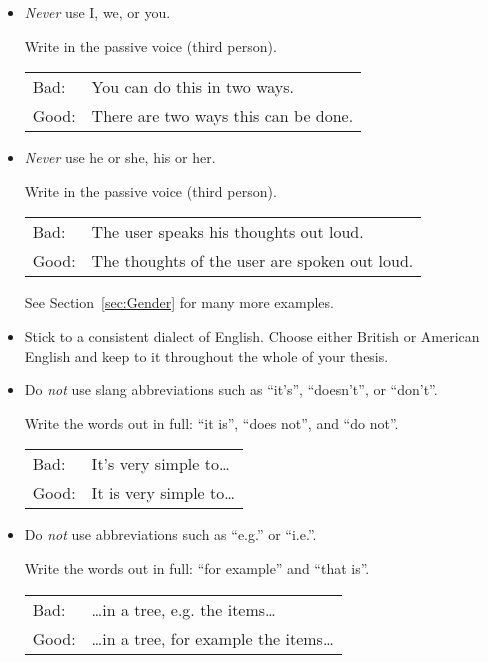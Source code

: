 \begin{itemize}

\item \emph{Never} use I, we, or you.

Write in the passive voice (third person).

\begin{tabular}{lp{0.9\hsize}}
Bad:  & You can do this in two ways.   \\
Good: & There are two ways this can be done.  \\
\end{tabular}



\item \emph{Never} use he or she, his or her.

Write in the passive voice (third person).

\begin{tabular}{lp{0.9\hsize}}
Bad:  & The user speaks his thoughts out loud.   \\
Good: & The thoughts of the user are spoken out loud.  \\
\end{tabular}

See Section~\ref{sec:Gender} for many more examples.



\item Stick to a consistent dialect of English. Choose either
  British or American English and keep to it throughout the
  whole of your thesis.



\item Do \emph{not} use slang abbreviations such as ``it's'',
  ``doesn't'', or ``don't''.

Write the words out in full: ``it is'', ``does not'', and ``do not''.

\begin{tabular}{lp{0.9\hsize}}
Bad:  & It's very simple to\ldots       \\
Good: & It is very simple to\ldots       \\
\end{tabular}



\item Do \emph{not} use abbreviations such as ``e.g.'' or
  ``i.e.''. 

Write the words out in full: ``for example'' and ``that is''.

\begin{tabular}{lp{0.9\hsize}}
Bad:  & \ldots in a tree, e.g. the items\ldots        \\
Good: & \ldots in a tree, for example the items\ldots   \\
\end{tabular}




\end{itemize}
